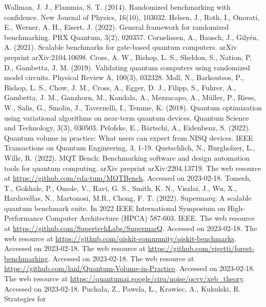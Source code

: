 \documentclass[preprint,12pt, a4paper, dvipsnames]{elsarticle}
\newcommand{\1}{{\rm 1\hspace{-0.9mm}l}}
\theoremstyle{definition}
\begin{document}
\begin{thebibliography}{00}
 Wallman, J. J.,  Flammia, S. T. (2014). Randomized benchmarking with confidence. New Journal of Physics, 16(10), 103032.
 Helsen, J., Roth, I., Onorati, E., Werner, A. H.,  Eisert, J. (2022). General framework for randomized benchmarking. PRX Quantum, 3(2), 020357.
 Cornelissen, A., Bausch, J.,  Gilyén, A. (2021). Scalable benchmarks for gate-based quantum computers. arXiv preprint arXiv:2104.10698.
Cross, A. W., Bishop, L. S., Sheldon, S., Nation, P. D., Gambetta, J. M. (2019). Validating quantum computers using randomized model circuits. Physical Review A, 100(3), 032328.
Moll, N., Barkoutsos, P., Bishop, L. S., Chow, J. M., Cross, A., Egger, D. J., Filipp, S., Fuhrer, A., Gambetta, J. M., Ganzhorn, M., Kandala, A., Mezzacapo, A., M{\"u}ller, P., Riess, W., Salis, G., Smolin, J., Tavernelli, I.,  Temme, K. (2018). Quantum optimization using variational algorithms on near-term quantum devices. Quantum Science and Technology, 3(3), 030503.
 Pelofske, E., Bärtschi, A.,  Eidenbenz, S. (2022). Quantum volume in practice: What users can expect from NISQ devices. IEEE Transactions on Quantum Engineering, 3, 1-19.
	 Quetschlich, N., Burgholzer, L., Wille, R. (2022). MQT Bench: Benchmarking software and design automation tools for quantum computing. arXiv preprint arXiv:2204.13719.
 The web resource at  \url{https://github.com/cda-tum/MQTBench}. Accessed on 2023-02-18.
	 Tomesh, T., Gokhale, P., Omole, V., Ravi, G. S., Smith, K. N., Viszlai, J., Wu, X.,  Hardavellas, N., Martonosi, M.R.,  Chong, F. T. (2022). Supermarq: A scalable quantum benchmark suite. In 2022 IEEE International Symposium on High-Performance Computer Architecture (HPCA) 587-603. IEEE.
 The web resource at \url{https://github.com/SupertechLabs/SupermarQ}. Accessed on 2023-02-18.
 The web resource at
\url{https://github.com/qiskit-community/qiskit-benchmarks}. Accessed on 2023-02-18.
 The web resource at \url{https://github.com/rigetti/forest-benchmarking}. Accessed on 2023-02-18.
 The web resource at \url{https://github.com/lanl/Quantum-Volume-in-Practice}. Accessed on 2023-02-18.
 The web resource at
\url{https://quantumai.google/cirq/noise/qcvv/xeb_theory}.  Accessed on 2023-02-18.
 Puchała, Z.,  Pawela, Ł.,  Krawiec, A.,  Kukulski, R. Strategies for

\end{thebibliography}
\end{document}
